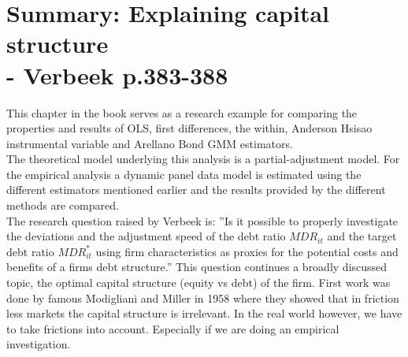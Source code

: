 \documentclass[document.tex]{subfiles}
\begin{document}
\section*{Summary: Explaining capital structure \protect\\ - Verbeek p.383-388}
This chapter in the book serves as a research example for comparing the properties and results of OLS, first differences, the within, Anderson Hsisao
instrumental variable and Arellano Bond GMM estimators. \\
The theoretical model underlying this analysis is a partial-adjustment model. For the empirical analysis a dynamic panel data model is estimated using the different estimators mentioned earlier and the results provided by the different methods are compared.\\
The research question raised by Verbeek is: ''Is it possible to properly investigate the 
deviations and the adjustment speed of the debt ratio $MDR_{it}$ and the target debt ratio $MDR^*_{it}$ using firm characteristics as proxies for the potential costs and benefits of a firms debt structure.'' This question continues a broadly discussed topic, the optimal capital structure (equity vs debt) of the firm. First work was done by famous Modigliani and Miller in 1958 where they showed that in friction less markets the capital structure is irrelevant. In the real world however, we have to take frictions into account. Especially if we are doing an empirical investigation.
\end{document}
